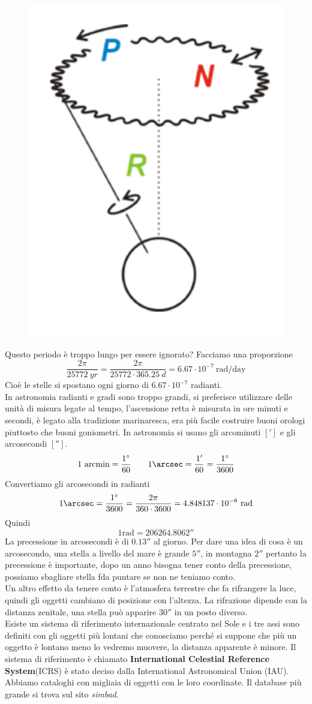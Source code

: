 \documentclass[a4paper,11pt]{article}
\begin{document}
\begin{figure}[ht]
    \centering
    \includegraphics[width=5 cm]{precessione e nutazione.png}
\end{figure}
Questo periodo è troppo lungo per essere ignorato? Facciamo una proporzione
$$\frac{2\pi}{25772\ yr}=\frac{2\pi}{25772\cdot 365.25\ d}=6.67\cdot 10^{-7}\ \text{rad/day}$$
Cioè le stelle si spostano ogni giorno di $6.67\cdot 10^{-7}$ radianti.\\
In astronomia radianti e gradi sono troppo grandi, si preferisce utilizzare delle unità di misura legate al tempo, l'ascensione retta è misurata in ore minuti e secondi, è legato alla tradizione marinaresca, era più facile costruire buoni orologi piuttosto che buoni goniometri. In astronomia si usano gli arcominuti $[']$ e gli arcosecondi $['']$.
$$1\text{ arcmin}=\frac{1^\circ}{60}\qquad 1 \arcsec =\frac{1'}{60}=\frac{1^\circ}{3600}$$
Convertiamo gli arcosecondi in radianti
$$1 \arcsec =\frac{1^\circ}{3600}=\frac{2\pi}{360\cdot3600}=4.848137\cdot 10^{-6}\ \text{rad}$$
Quindi 
$$1\text{rad}=206264.8062''$$
La precessione in arcosecondi è di $0.13''$ al giorno.
Per dare una idea di cosa è un arcosecondo, una stella a livello del mare è grande $5''$, in montagna $2''$ pertanto la precessione è importante, dopo un anno bisogna tener conto della precessione, possiamo sbagliare stella fda puntare se non ne teniamo conto.\\
Un altro effetto da tenere conto è l'atmosfera terrestre che fa rifrangere la luce, quindi gli oggetti cambiano di posizione con l'altezza. La rifrazione dipende con la distanza zenitale, una stella può apparire $30''$ in un posto diverso.\\
Esiste un sistema di riferimento internazionale centrato nel Sole e i tre assi sono definiti con gli oggetti più lontani che conosciamo perché si suppone che più un oggetto è lontano meno lo vedremo muovere, la distanza apparente è minore. Il sistema di riferimento è chiamato \textbf{International Celestial Reference System}(ICRS) è stato deciso dalla International Astronomical Union (IAU). Abbiamo cataloghi con migliaia di oggetti con le loro coordinate. Il database più grande si trova sul sito \textit{simbad}.
\end{document}
